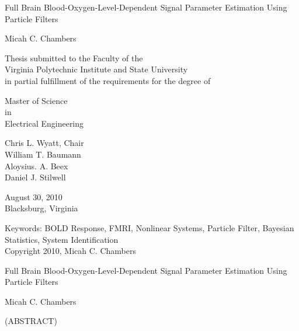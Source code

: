 \documentclass[12pt]{report}
\numberwithin{algorithm}{chapter}
\begin{document}
\thispagestyle{empty}
\begin{center}

{\Large 
Full Brain Blood-Oxygen-Level-Dependent Signal Parameter Estimation Using Particle Filters
}

\vfill

Micah C. Chambers

\vfill

Thesis submitted to the Faculty of the \\
Virginia Polytechnic Institute and State University \\
in partial fulfillment of the requirements for the degree of

\vfill

Master of Science \\
in \\
Electrical Engineering

\vfill

Chris L. Wyatt, Chair \\
William T. Baumann\\
Aloysius. A. Beex \\
Daniel J. Stilwell

\vfill

August 30, 2010\\
Blacksburg, Virginia

\vfill

Keywords: BOLD Response, FMRI, Nonlinear Systems, Particle Filter, Bayesian Statistics, System Identification
\\
Copyright 2010, Micah C. Chambers

\end{center}

\pagebreak

\thispagestyle{empty}
\begin{center}

{\large Full Brain Blood-Oxygen-Level-Dependent Signal Parameter Estimation Using Particle Filters}

\vfill

Micah C. Chambers

\vfill

(ABSTRACT)

\vfill

\end{center}
\end{document}
